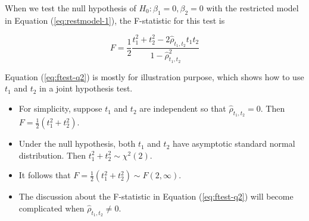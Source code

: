 \documentclass[a4paper,11pt]{article}
\begin{document}
When we test the null hypothesis of \(H_0: \beta_1 = 0, \beta_2 = 0\)
with the restricted model in Equation (\ref{eq:restmodel-1}), the
F-statistic for this test is

\begin{equation}
\label{eq:ftest-q2}
F = \frac{1}{2}\frac{t_1^2 + t_2^2 - 2 \hat{\rho}_{t_1,t_2}t_1t_2}{1 - \hat{\rho}_{t_1,t_2}^2}
\end{equation}

Equation (\ref{eq:ftest-q2}) is mostly for illustration purpose, which
shows how to use \(t_1\) and \(t_2\) in a joint hypothesis test.
\begin{itemize}
\item For simplicity, suppose \(t_1\) and \(t_2\) are independent so that
\(\hat{\rho}_{t_1,t_2} = 0\). Then \(F = \frac{1}{2}(t_1^2 +
  t_2^2)\).
\item Under the null hypothesis, both \(t_1\) and \(t_2\) have asymptotic
standard normal distribution. Then \(t^2_1 + t^2_2 \sim \chi^2(2)\).
\item It follows that \(F = \frac{1}{2}(t^2_1 + t^2_2) \sim F(2, \infty)\).
\item The discussion about the F-statistic in Equation (\ref{eq:ftest-q2})
will become complicated when \(\hat{\rho}_{t_1,t_2} \neq 0\).
\end{itemize}
\end{document}
